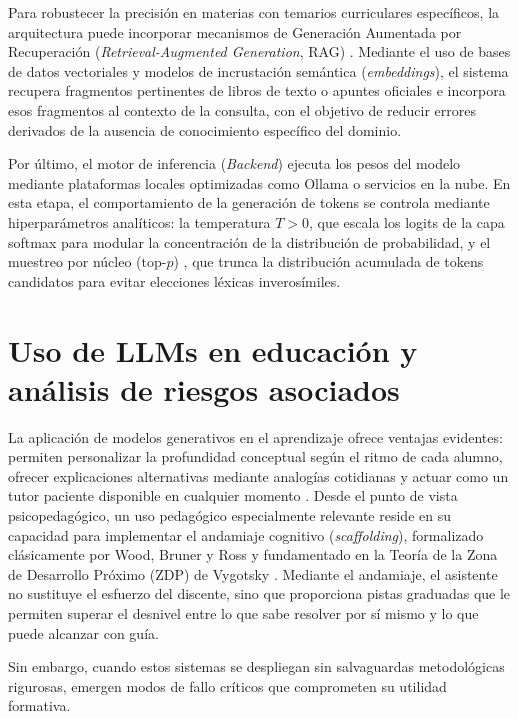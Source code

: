 Para robustecer la precisión en materias con temarios curriculares específicos, la arquitectura puede incorporar mecanismos de Generación Aumentada por Recuperación (\textit{Retrieval-Augmented Generation}, RAG) \cite{lewis2020retrieval}. Mediante el uso de bases de datos vectoriales y modelos de incrustación semántica (\textit{embeddings}), el sistema recupera fragmentos pertinentes de libros de texto o apuntes oficiales e incorpora esos fragmentos al contexto de la consulta, con el objetivo de reducir errores derivados de la ausencia de conocimiento específico del dominio.

Por último, el motor de inferencia (\textit{Backend}) ejecuta los pesos del modelo mediante plataformas locales optimizadas como Ollama o servicios en la nube. En esta etapa, el comportamiento de la generación de tokens se controla mediante hiperparámetros analíticos: la temperatura $T > 0$, que escala los logits de la capa softmax para modular la concentración de la distribución de probabilidad, y el muestreo por núcleo ($\text{top-}p$) \cite{holtzman2020curious}, que trunca la distribución acumulada de tokens candidatos para evitar elecciones léxicas inverosímiles.

\section{Uso de LLMs en educación y análisis de riesgos asociados}
\label{sec:llm_educacion_riesgos}
La aplicación de modelos generativos en el aprendizaje ofrece ventajas evidentes: permiten personalizar la profundidad conceptual según el ritmo de cada alumno, ofrecer explicaciones alternativas mediante analogías cotidianas y actuar como un tutor paciente disponible en cualquier momento \cite{kasneci2023chatgpt}. Desde el punto de vista psicopedagógico, un uso pedagógico especialmente relevante reside en su capacidad para implementar el andamiaje cognitivo (\textit{scaffolding}), formalizado clásicamente por Wood, Bruner y Ross \cite{wood1976role} y fundamentado en la Teoría de la Zona de Desarrollo Próximo (ZDP) de Vygotsky \cite{vygotsky1978mind}. Mediante el andamiaje, el asistente no sustituye el esfuerzo del discente, sino que proporciona pistas graduadas que le permiten superar el desnivel entre lo que sabe resolver por sí mismo y lo que puede alcanzar con guía.

Sin embargo, cuando estos sistemas se despliegan sin salvaguardas metodológicas rigurosas, emergen modos de fallo críticos que comprometen su utilidad formativa.

